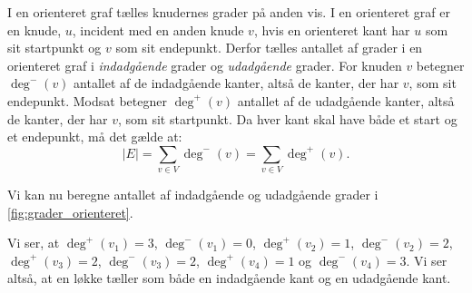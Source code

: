 I en orienteret graf tælles knudernes grader på anden vis. I en orienteret graf er en knude, $u$, incident med en anden knude $v$, hvis en orienteret kant har $u$ som sit startpunkt og $v$ som sit endepunkt. Derfor tælles antallet af grader i en orienteret graf i \emph{indadgående} grader og \emph{udadgående} grader. 
For knuden $v$ betegner $\deg^{-}(v)$ antallet af de indadgående kanter, altså de kanter, der har $v$, som sit endepunkt. Modsat betegner $\deg^{+}(v)$ antallet af de udadgående kanter, altså de kanter, der har $v$, som sit startpunkt. Da hver kant skal have både et start og et endepunkt, må det gælde at:
\begin{equation}
|E|=\sum_{v \in V} { } \deg^{-}(v) = \sum_{v \in V} { } \deg^{+}(v).
\end{equation}

\begin{exmp} \label{ex:grader_orienteret}
Vi kan nu beregne antallet af indadgående og udadgående grader i \autoref{fig:grader_orienteret}.

Vi ser, at $\deg^{+}(v_{1})=3$, $\deg^{-}(v_{1})=0$, $\deg^{+}(v_{2})=1$, $\deg^{-}(v_{2})=2$, $\deg^{+}(v_{3})=2$, $\deg^{-}(v_{3})=2$, $\deg^{+}(v_{4})=1$ og $\deg^{-}(v_{4})=3$. Vi ser altså, at en løkke tæller som både en indadgående kant og en udadgående kant.
\end{exmp}